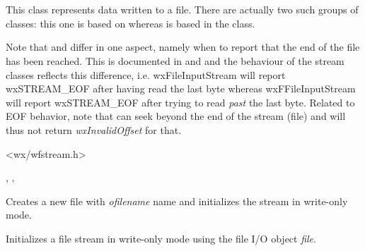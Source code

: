 \section{}\label{wxfileoutputstream}

This class represents data written to a file. There are actually
two such groups of classes: this one is based on  
whereas  is based in
the  class.

Note that  and  differ
in one aspect, namely when to report that the end of the file has been
reached. This is documented in  and 
 and the behaviour of the stream
classes reflects this difference, i.e. wxFileInputStream will report
wxSTREAM\_EOF after having read the last byte whereas wxFFileInputStream
will report wxSTREAM\_EOF after trying to read {\it past} the last byte.
Related to EOF behavior, note that  
can seek beyond the end of the stream (file) and will thus not return 
{\it wxInvalidOffset} for that.




<wx/wfstream.h>


, , 


\label{wxfileoutputstreamctor}


Creates a new file with {\it ofilename} name and initializes the stream in
write-only mode. 


Initializes a file stream in write-only mode using the file I/O object {\it file}.

